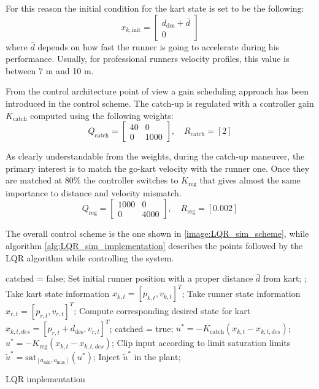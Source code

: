 \documentclass[a4paper,12pt,oneside]{book}
\begin{document}
For this reason the initial condition for the kart state is set to be the following:
\begin{equation}
    x_{k,\text{init}} =
    \begin{bmatrix}
        d_{\text{des}} + \bar{d} \\
        0
    \end{bmatrix}
\end{equation}
where $\bar{d}$ depends on how fast the runner is going to accelerate during his performance. Usually, for professional runners velocity profiles, this value is between 7 m and 10 m.
 
\bigskip
From the control architecture point of view a gain scheduling approach has been introduced in the control scheme.
The catch-up is regulated with a controller gain $K_{\text{catch}}$ computed using the following weights: 
\begin{equation}
    Q_{\text{catch}} =
    \begin{bmatrix}
        40 & 0 \\
        0 & 1000
    \end{bmatrix},
    \quad
    R_{\text{catch}} = [2]
\end{equation}

As clearly understandable from the weights, during the catch-up maneuver, the primary interest is to match the go-kart velocity with the runner one.
Once they are matched at 80\% the controller switches to $K_{\text{reg}}$ that gives almost the same importance to distance and velocity mismatch.
\begin{equation}
    Q_{\text{reg}} =
    \begin{bmatrix}
        1000 & 0 \\
        0 & 4000
    \end{bmatrix},
    \quad
    R_{\text{reg}} = [0.002]
\end{equation}



The overall control scheme is the one shown in \ref{image:LQR_sim_scheme}, while algorithm \ref{alg:LQR_sim_implementation} describes the points followed by the LQR algorithm while controlling the system.
\begin{algorithm}
\begin{algorithmic}[1]
	\State catched = false;
	\State Set initial runner position with a proper distance $\bar{d}$ from kart;
	;
		\State Take kart state information $x_{k,t} = [p_{k,t}, v_{k,t}]^T$;
		\State Take runner state information $x_{r,t} = [p_{r,t}, v_{r,t}]^T$;
		\State Compute corresponding desired state for kart $x_{k,t,des} = [p_{r,t} + d_{\text{des}}, v_{r,t}]^T$;
			\State catched = true;
		\EndIf
			\State $u^* = - K_{\text{catch}} (x_{k,t} - x_{k,t,des}) $;
		\Else 
			\State $u^* = - K_{\text{reg}} (x_{k,t} - x_{k,t,des}) $;
		\EndIf
		\State Clip input according to limit saturation limits $\tilde{u}^* = \text{sat}_{[a_{\min}, a_{\max}]} (u^*)$;
		\State Inject $\tilde{u}^*$ in the plant;
	\EndFor
\caption{LQR implementation}
\label{alg:LQR_sim_implementation}
\end{algorithmic}
\end{algorithm}
\end{document}
